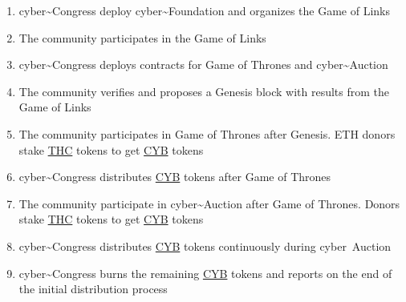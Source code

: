 \documentclass[8pt,oneside]{amsart}
\begin{document}
\begin{enumerate}
 \item cyber\~{}Congress deploy cyber\~{}Foundation and organizes the Game of Links
 \item The community participates in the Game of Links
 \item cyber\~{}Congress deploys contracts for Game of Thrones and cyber\~{}Auction
 \item The community verifies and proposes a Genesis block with results from the Game of Links
 \item The community participates in Game of Thrones after Genesis. ETH donors stake {\hyperref[thc]{THC}} tokens to get {\hyperref[cyb]{CYB}} tokens
 \item cyber\~{}Congress distributes {\hyperref[cyb]{CYB}} tokens after Game of Thrones
 \item The community participate in cyber\~{}Auction after Game of Thrones. Donors stake {\hyperref[thc]{THC}} tokens to get {\hyperref[cyb]{CYB}} tokens
 \item cyber\~{}Congress distributes {\hyperref[cyb]{CYB}} tokens continuously during cyber~Auction
 \item cyber\~{}Congress burns the remaining {\hyperref[cyb]{CYB}} tokens and reports on the end of the initial distribution process
\end{enumerate}
\end{document}
